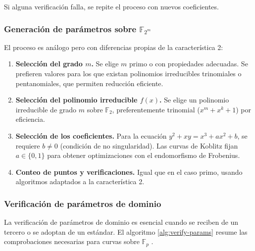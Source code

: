 Si alguna verificación falla, se repite el proceso con nuevos coeficientes.

\subsubsection{\texorpdfstring{Generación de parámetros sobre $\mathbb{F}_{2^m}$}{Generacion de parametros sobre F2m}}
\label{subsubsec:gen-params-f2m}

El proceso es análogo pero con diferencias propias de la característica 2:

\begin{enumerate}
    \item \textbf{Selección del grado $m$.} Se elige $m$ primo o con propiedades adecuadas. Se prefieren valores para los que existan polinomios irreducibles trinomiales o pentanomiales, que permiten reducción eficiente.
    
    \item \textbf{Selección del polinomio irreducible $f(x)$.} Se elige un polinomio irreducible de grado $m$ sobre $\mathbb{F}_2$, preferentemente trinomial ($x^m + x^k + 1$) por eficiencia.
    
    \item \textbf{Selección de los coeficientes.} Para la ecuación $y^2 + xy = x^3 + ax^2 + b$, se requiere $b \neq 0$ (condición de no singularidad). Las curvas de Koblitz fijan $a \in \{0, 1\}$ para obtener optimizaciones con el endomorfismo de Frobenius.
    
    \item \textbf{Conteo de puntos y verificaciones.} Igual que en el caso primo, usando algoritmos adaptados a la característica 2.
\end{enumerate}


\subsubsection{Verificación de parámetros de dominio}
\label{subsubsec:verificacion-params}

La verificación de parámetros de dominio es esencial cuando se reciben de un tercero o se adoptan de un estándar. El algoritmo \ref{alg:verify-params} resume las comprobaciones necesarias para curvas sobre $\mathbb{F}_p$ \cite{hankerson2004guide,sec1-v2}.

